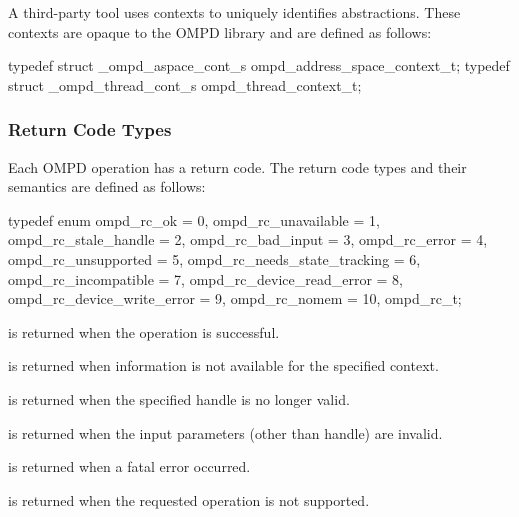 A third-party tool uses contexts to uniquely  identifies abstractions. These contexts are opaque to 
the OMPD library and are defined as follows:

\format

\begin{ccppspecific}
\begin{ompSyntax}
typedef struct _ompd_aspace_cont_s ompd_address_space_context_t;
typedef struct _ompd_thread_cont_s ompd_thread_context_t;
\end{ompSyntax}
\end{ccppspecific}


\subsubsection{Return Code Types}
\label{ompd:ompd_rc_t}

Each OMPD operation has a return code. The return code types and their semantics are defined as 
follows:

\format

\begin{ccppspecific}
\begin{ompSyntax}
typedef enum {
  ompd_rc_ok = 0,
  ompd_rc_unavailable = 1,
  ompd_rc_stale_handle = 2,
  ompd_rc_bad_input = 3,
  ompd_rc_error = 4,
  ompd_rc_unsupported = 5,
  ompd_rc_needs_state_tracking = 6,
  ompd_rc_incompatible = 7,
  ompd_rc_device_read_error = 8,
  ompd_rc_device_write_error = 9,
  ompd_rc_nomem = 10,
} ompd_rc_t;	
\end{ompSyntax}
\end{ccppspecific}


\descr
\label{ompd:ompd_rc_ok}
 is returned when the operation is successful.

\label{ompd:ompd_rc_unavailable}
 is returned when 
information is not available for the specified context.

\label{ompd:ompd_rc_stale_handle}
 is returned when
the specified handle is no longer valid.

\label{ompd:ompd_rc_bad_input}
 is returned when
the input parameters (other than handle) are invalid. 

\label{ompd:ompd_rc_error}
 is returned when
a fatal error occurred.

\label{ompd:ompd_rc_unsupported}
 is returned when
the requested operation is not supported.

